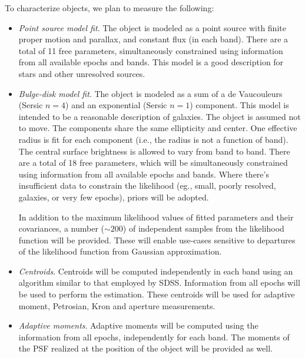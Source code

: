 \documentclass[12pt]{article}
\begin{document}
\vspace{1em}

To characterize objects, we plan to measure the following:
%
\begin{itemize}
    \item {\em Point source model fit}. The object is modeled as a point source with finite proper motion and parallax, and constant flux (in each band). There are a total of 11 free parameters, simultaneously constrained using information from all available epochs and bands. This model is a good description for stars and other unresolved sources.
    \item {\em Bulge-disk model fit}. The object is modeled as a sum of a de Vaucouleurs (Sersic $n=4$) and an exponential (Sersic $n=1$) component. This model is intended to be a reasonable description of galaxies. The object is assumed not to move. The components share the same ellipticity and center. One effective radius is fit for each component (i.e., the radius is not a function of band). The central surface brightness is allowed to vary from band to band. There are a total of 18 free parameters, which will be simultaneously constrained using information from all available epochs and bands. Where there's insufficient data to constrain the likelihood (eg., small, poorly resolved, galaxies, or very few epochs), priors will be adopted.

   In addition to the maximum likelihood values of fitted parameters and their covariances, a number ($\sim 200$) of independent samples from the likelihood function will be provided. These will enable use-cases sensitive to departures of the likelihood function from Gaussian approximation.

    \item {\em Centroids}. Centroids will be computed independently in each band using an algorithm similar to that employed by SDSS. Information from all epochs will be used to perform the estimation. These centroids will be used for adaptive moment, Petrosian, Kron and aperture measurements.

    \item {\em Adaptive moments}. Adaptive moments will be computed using the information from all epochs, independently for each band. The moments of the PSF realized at the position of the object will be provided as well.
    

\end{itemize}
\end{document}
